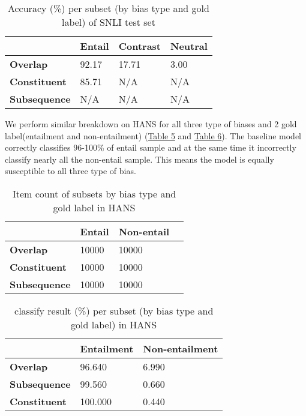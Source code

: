 \documentclass{article}
\begin{document}
\begin{table}[h]
    \caption{Accuracy (\%) per subset (by bias type and gold label) of SNLI test set}
    \label{table4}
\centering
\begin{tabular}{l l l l}
\hline
\textbf{} & \textbf{Entail} & \textbf{Contrast} & \textbf{Neutral} \\ \hline
\textbf{Overlap}     & 92.17         & 17.71           & 3.00           \\
\textbf{Constituent} & 85.71         & N/A               & N/A              \\
\textbf{Subsequence} & N/A             & N/A               & N/A              \\ \hline
\end{tabular}


\end{table}


We perform similar breakdown on HANS for all three type of biases and 2 gold label(entailment and non-entailment) (\hyperref[table5]{Table 5} and \hyperref[table6]{Table 6}).
The baseline model correctly classifies 96-100\% of entail sample and at the same time it incorrectly classify nearly all the non-entail sample.
This means the model is equally susceptible to all three type of bias.

\begin{table}[H]
    \caption{Item count of subsets by bias type and gold label in HANS}
\label{table5}
\centering
\begin{tabular}{l l l l}
\hline
\textbf{}            & \textbf{Entail} & \textbf{Non-entail} \\ \hline
\textbf{Overlap}     & 10000    & 10000         \\
\textbf{Constituent} & 10000     & 10000              \\
\textbf{Subsequence} & 10000      & 10000             \\ \hline
\end{tabular}

\end{table}
\begin{table}[h]
    \label{table6}
    \caption{classify result (\%) per subset (by bias type and gold label) in HANS}
\centering
\begin{tabular}{l l l}
\hline
\textbf{} & \textbf{Entailment} & \textbf{Non-entailment} \\ \hline
\textbf{Overlap} & 96.640 & 6.990 \\
\textbf{Subsequence} & 99.560 & 0.660 \\
\textbf{Constituent} & 100.000 & 0.440 \\ \hline
\end{tabular}
\end{table}
\end{document}
